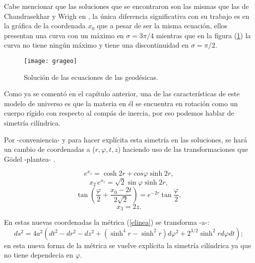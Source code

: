 \documentclass[11pt]{book}
\begin{document}
Cabe mencionar que las soluciones que se encontraron son las mismas que las de Chandrasekhar y Wrigh en \cite{chandra}, la única diferencia significativa con su trabajo es en la gráfica de la coordenada $x_0$ que a pesar de ser la misma ecuación, ellos presentan una curva con un máximo en $\sigma=3\pi /4$ mientras que en la figura (\ref{geodesicas}) la curva no tiene ningún máximo y tiene una discontinuidad en $\sigma =\pi/2$.

\begin{figure}[h!]
\centering
\texttt{[image: grageo]}
\caption{Solución de las ecuaciones de las geodésicas.%
 }
\label{geodesicas}
\end{figure}

Como ya se comentó en el capítulo anterior, una de las características de este modelo de universo es que la materia en él se encuentra en rotación como un cuerpo rígido con respecto al compás de inercia, por eso podemos hablar de simetría cilíndrica. 

Por -conveniencia- y para hacer explícita esta simetría %
en las soluciones, se hará un cambio de coordenadas a ($r, \varphi, t, z$) haciendo uso de las transformaciones que Gödel -plantea- \cite{godel}. 

\begin{equation}
e^{x_{1}}=\cosh 2r+cos\varphi \sinh 2r,
\label{tx1}
\end{equation}
%
\begin{equation}
x_2 \, e^{x_{1}}=\sqrt{2}\sin\varphi \sinh 2r,
\label{tx2}
\end{equation}
%
\begin{equation}
\tan\left(\frac{\varphi}{2}+\frac{x_0-2t}{2\sqrt{2}}\right)=e^{-2r}\tan\frac{\varphi}{2},
\label{tx0}
\end{equation}
%
\begin{equation}\label{13}
x_{3}=2z.
\label{tx3}
\end{equation}

En estas nuevas coordenadas la métrica (\ref{elinea}) se transforma -a-:
\begin{equation}
ds^{2}=4a^{2}(dt^{2}-dr^{2}-dz^{2}+(\sinh^{4}r-\sinh^{2}r)d\varphi^{2}+2^{3/2}\sinh^{2}r d\varphi dt);
\label{elineac}
\end{equation}
en esta nueva forma de la métrica se vuelve explícita la simetría cilíndrica ya que no tiene dependecia en $\varphi$.
\end{document}

